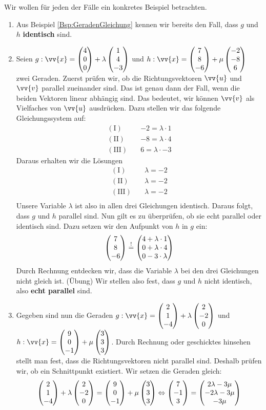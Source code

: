 \documentclass[ngerman, 12pt]{nssheetxea}
\begin{document}
\begin{example}
Wir wollen für jeden der Fälle ein konkretes Beispiel betrachten.
\begin{enumerate}
\item Aus Beispiel \ref{Bsp:GeradenGleichung} kennen wir bereits den Fall, dass $g$ und $h$ \textbf{identisch} sind.
\item Seien $g:\vv{x}=\colvec[4]{0}{0} + \lambda \colvec[1]{4}{-3}$ und $h:\vv{x}=\colvec[7]{8}{-6} + \mu \colvec[-2]{-8}{6}$ zwei Geraden. Zuerst prüfen wir, ob die Richtungsvektoren $\vv{u}$ und $\vv{v}$ parallel zueinander sind. Das ist genau dann der Fall, wenn die beiden Vektoren linear abhängig sind. Das bedeutet, wir können $\vv{v}$ als Vielfaches von $\vv{u}$ ausdrücken. Dazu stellen wir das folgende Gleichungssystem auf:
\begin{align*}
\mathrm{(I)} \quad & -2 = \lambda \cdot 1 \\
\mathrm{(II)} \quad & -8 = \lambda \cdot 4 \\
\mathrm{(III)} \quad & 6 = \lambda \cdot -3
\end{align*}
Daraus erhalten wir die Lösungen
\begin{align*}
\mathrm{(I)} \quad & \lambda = -2 \\
\mathrm{(II)} \quad & \lambda = -2 \\
\mathrm{(III)} \quad & \lambda = -2 \\
\end{align*}
Unsere Variable $\lambda$ ist also in allen drei Gleichungen identisch. Daraus folgt, dass $g$ und $h$ parallel sind. Nun gilt es zu überprüfen, ob sie echt parallel oder identisch sind. Dazu setzen wir den Aufpunkt von $h$ in $g$ ein:
\[ \colvec[7]{8}{-6} \stackrel{!}{=} \colvec[4+\lambda \cdot 1]{0 + \lambda \cdot 4}{0 - 3\cdot \lambda}  \]
Durch Rechnung entdecken wir, dass die Variable $\lambda$ bei den drei Gleichungen nicht gleich ist. (Übung) Wir stellen also fest, dass $g$ und $h$ nicht identisch, also \textbf{echt parallel} sind.
\item Gegeben sind nun die Geraden $g:\vv{x}=\colvec[2]{1}{-4} + \lambda \colvec[2]{-2}{0}$ und $h:\vv{x}=\colvec[9]{0}{-1} + \mu \colvec[3]{3}{3}$. Durch Rechnung oder geschicktes hinsehen stellt man fest, dass die Richtungsvektoren nicht parallel sind. Deshalb prüfen wir, ob ein Schnittpunkt existiert. Wir setzen die Geraden gleich:
\[ \colvec[2]{1}{-4} + \lambda \colvec[2]{-2}{0} = \colvec[9]{0}{-1} + \mu \colvec[3]{3}{3}  \Leftrightarrow \colvec[7]{-1}{3} = \colvec[2\lambda - 3\mu]{-2\lambda - 3 \mu}{-3\mu}\]

\end{enumerate}
\end{example}
\end{document}
